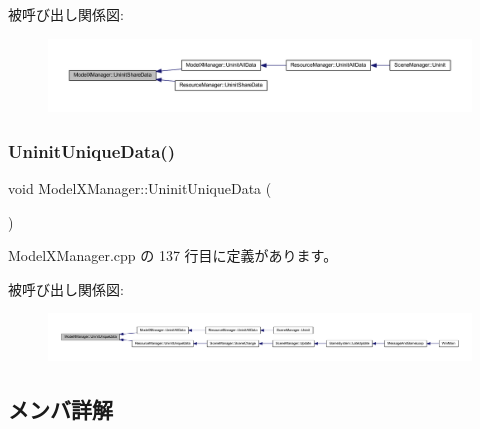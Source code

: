 被呼び出し関係図\+:
\nopagebreak
\begin{figure}[H]
\begin{center}
\leavevmode
\includegraphics[width=350pt]{class_model_x_manager_a9e3d0dc8addebebc87f450cde6c5e659_icgraph}
\end{center}
\end{figure}
\mbox{\label{class_model_x_manager_a7dde269502f40b7d1208c8e0f84b13f0}} 
\subsubsection{\texorpdfstring{Uninit\+Unique\+Data()}{UninitUniqueData()}}
{\footnotesize\ttfamily void Model\+X\+Manager\+::\+Uninit\+Unique\+Data (\begin{DoxyParamCaption}{ }\end{DoxyParamCaption})\hspace{0.3cm}{\ttfamily [static]}}



 Model\+X\+Manager.\+cpp の 137 行目に定義があります。

被呼び出し関係図\+:
\nopagebreak
\begin{figure}[H]
\begin{center}
\leavevmode
\includegraphics[width=350pt]{class_model_x_manager_a7dde269502f40b7d1208c8e0f84b13f0_icgraph}
\end{center}
\end{figure}


\subsection{メンバ詳解}
\mbox{\label{class_model_x_manager_a745ad339e5fc73cec28d205881a969f8}} 
